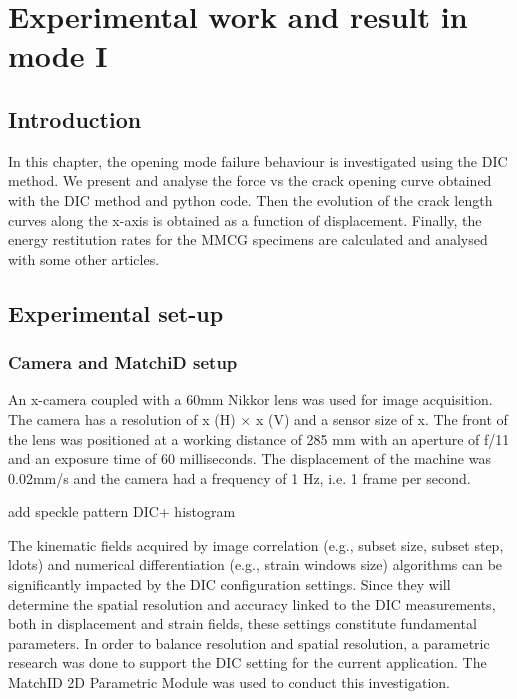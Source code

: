 \chapter{Experimental work and result in mode I}
\label{Chapter3}

\section{Introduction}

In this chapter, the opening mode failure behaviour is investigated using the DIC method. We present and analyse the force vs the crack opening curve obtained with the DIC method and python code.  Then the evolution of the crack length curves along the x-axis is obtained as a function of displacement. Finally, the energy restitution rates for the MMCG specimens are calculated and analysed with some other articles.

\section{Experimental set-up}

\subsection{Camera and MatchiD setup}
An x-camera coupled with a 60mm Nikkor lens was used for image acquisition. The camera has a resolution of x (H) × x (V) and a sensor size of x. The front of the lens was positioned at a working distance of 285 mm with an aperture of f/11 and an exposure time of 60 milliseconds. The displacement of the machine was 0.02mm/s and the camera had a frequency of 1 Hz, i.e. 1 frame per second.

add speckle pattern DIC+ histogram

The kinematic fields acquired by image correlation (e.g., subset size, subset step, ldots) and numerical differentiation (e.g., strain windows size) algorithms can be significantly impacted by the DIC configuration settings. Since they will determine the spatial resolution and accuracy linked to the DIC measurements, both in displacement and strain fields, these settings constitute fundamental parameters.  In order to balance resolution and spatial resolution, a parametric research was done to support the DIC setting for the current application. The MatchID 2D Parametric Module was used to conduct this investigation.

